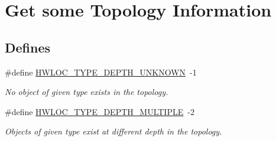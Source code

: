 \hypertarget{group__hwlocality__information}{
\section{Get some Topology Information}
\label{group__hwlocality__information}
}
\subsection*{Defines}
\begin{DoxyCompactItemize}
\item 
\#define \hyperlink{group__hwlocality__information_ga9e86ce528f626330de2da7adb6c4e02e}{HWLOC\_\-TYPE\_\-DEPTH\_\-UNKNOWN}~-\/1
\begin{DoxyCompactList}\small\item\em No object of given type exists in the topology. \item\end{DoxyCompactList}\item 
\#define \hyperlink{group__hwlocality__information_ga64c80d3e0501b321d217b1642d68e23d}{HWLOC\_\-TYPE\_\-DEPTH\_\-MULTIPLE}~-\/2
\begin{DoxyCompactList}\small\item\em Objects of given type exist at different depth in the topology. \item\end{DoxyCompactList}\end{DoxyCompactItemize}
